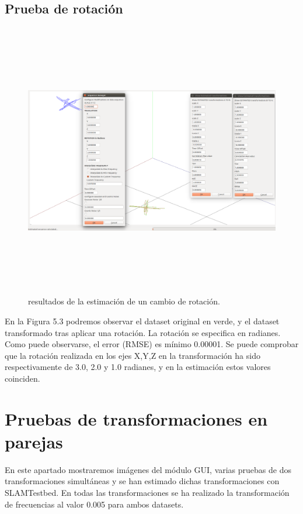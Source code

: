 \subsection{Prueba de rotación}

\begin{figure}[h]
\label{fig:rotationTest}\includegraphics[height=12.0cm,width=18.0cm]{img/cap6/Rotation_ab_ba.png}
\hspace{0.5cm}


\caption{resultados de la estimación de un cambio de rotación.}
\end{figure}

En la Figura 5.3 podremos observar el dataset original en verde, y el dataset transformado tras aplicar una rotación. La rotación se especifica en radianes. Como puede observarse, el error (RMSE) es mínimo 0.00001. Se puede comprobar que la rotación realizada en los ejes X,Y,Z en la transformación ha sido respectivamente de 3.0, 2.0 y 1.0 radianes, y en la estimación estos valores coinciden.


\section{Pruebas de transformaciones en parejas}
En este apartado mostraremos imágenes del módulo GUI, varias pruebas de dos  transformaciones simultáneas y se han estimado dichas transformaciones con SLAMTestbed.
En todas las transformaciones se ha realizado la transformación de frecuencias al valor 0.005 para ambos datasets. 

